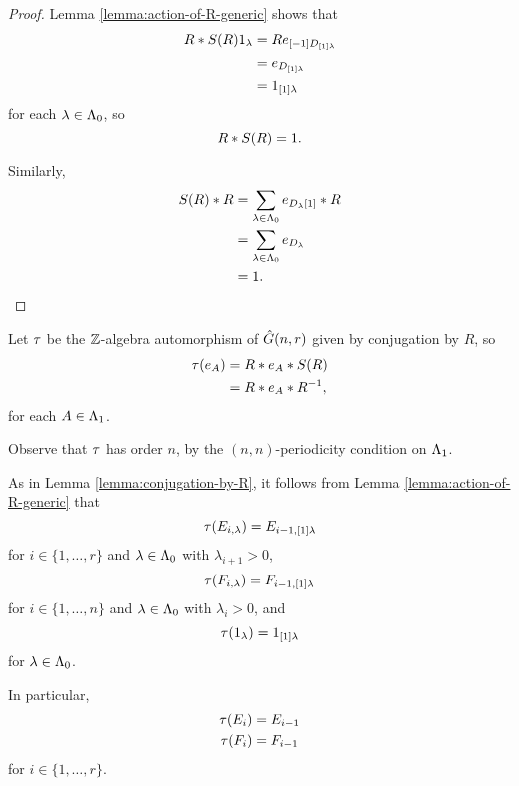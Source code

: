 \documentclass[a4paper, 11pt]{report}
\begin{document}
\begin{proof}
Lemma \ref{lemma:action-of-R-generic} shows that
\begin{align*}
R\ast S{(R)} 1_\lambda &= R e_{[-1]D_{[1]\lambda}}\\
&= e_{D_{[1]\lambda}}\\
&= 1_{[1]\lambda}
\end{align*}
for each $\lambda\in\Lambda_0{}$, so
\begin{equation*}
R \ast S{(R)} = 1.
\end{equation*}

Similarly,
\begin{align*}
S{(R)}\ast R &= \sum_{\lambda\in\Lambda_0{}} e_{D_{\lambda} [1]}\ast R\\
&= \sum_{\lambda\in\Lambda_0{}} e_{D_{\lambda}}\\
&= 1.
\end{align*}
\end{proof}

Let $\tau{}$ be the $\mathbb{Z}$-algebra automorphism of $\hat{G}(n,r)$ given by conjugation by $R$, so
\begin{align*}
\tau{(e_A)} &= R\ast e_A \ast S{(R)}\\
&= R\ast e_A \ast R^{-1},
\end{align*}
for each $A\in\Lambda_1{}$.

Observe that $\tau{}$ has order $n$, by the $(n,n)$-periodicity condition on $\Lambda_1{}$.

As in Lemma \ref{lemma:conjugation-by-R}, it follows from Lemma \ref{lemma:action-of-R-generic} that
\begin{equation*}
\tau{(E_{i,\lambda})} = E_{i-1,[1]\lambda}
\end{equation*}
for $i\in\{1,\ldots,r\}$ and $\lambda\in\Lambda_0{}$ with $\lambda_{i+1}>0$,
\begin{equation*}
\tau{(F_{i,\lambda})} = F_{i-1,[1]\lambda}
\end{equation*}
for $i\in\{1,\ldots,n\}$ and $\lambda\in\Lambda_0{}$ with $\lambda_i>0$, and
\begin{equation*}
\tau{(1_\lambda)} = 1_{[1]\lambda}
\end{equation*}
for $\lambda\in\Lambda_0{}$.

In particular,
\begin{align*}
\tau{(E_i)} &= E_{i-1}\\
\tau{(F_i)} &= F_{i-1}
\end{align*}
for $i\in\{1,\ldots,r\}$.
\end{document}
